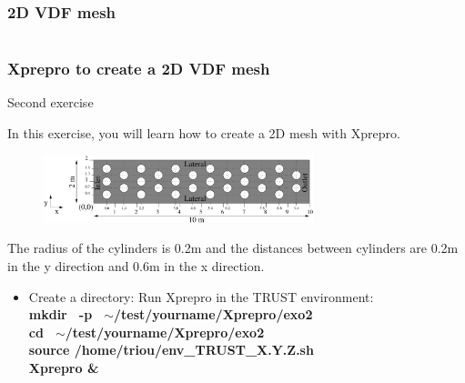 \documentclass[10pt]{beamer}
\begin{document}
\subsubsection{2D VDF mesh}
\begin{frame}
\begin{columns}[c] 
\tableofcontents[sections={1-7},currentsection, currentsubsection]
\tableofcontents[sections={8-13},currentsection, currentsubsection]
\end{columns}
\end{frame}
\begin{frame}
\frametitle{Xprepro to create a 2D VDF mesh}
\begin{block}{Second exercise}

In this exercise, you will learn how to create a 2D mesh with Xprepro. 

\begin{figure}
\includegraphics[width=0.7\textwidth]{PICTURES/xprepro.pdf}
\end{figure}

The radius of the cylinders is 0.2m and the distances between cylinders are 0.2m in the y direction and 0.6m in the x direction. \\

\begin{itemize}
\item Create a directory: Run Xprepro in the TRUST environment:\\
\textbf{mkdir \, -p \, $\sim$/test/yourname/Xprepro/exo2} \\
\textbf{cd \, $\sim$/test/yourname/Xprepro/exo2} \\
\textbf{source /home/triou/env\_TRUST\_X.Y.Z.sh }\\
\textbf{Xprepro \&} 
\end{itemize}

\end{block}
\end{frame}
\end{document}
